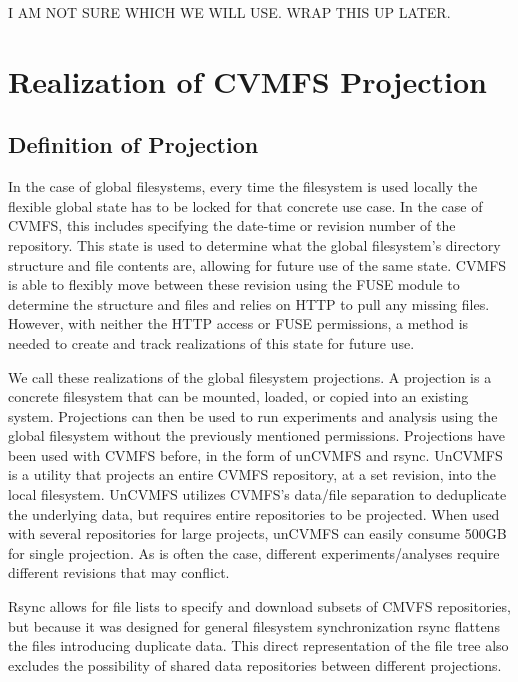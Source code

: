 \documentclass[conference]{IEEEtran}
\begin{document}
I AM NOT SURE WHICH WE WILL USE. WRAP THIS UP LATER.

\section{Realization of CVMFS Projection}



\subsection{Definition of Projection}

In the case of global filesystems,
every time the filesystem is used locally
the flexible global state has to be 
locked for that concrete use case.
In the case of CVMFS,
this includes specifying the date-time
or revision number of the repository.
This state is used to determine 
what the global filesystem's directory
structure and file contents are, 
allowing for future use of the same state.
CVMFS is able to flexibly move
between these revision using the FUSE module
to determine the structure and files and
relies on HTTP to pull any missing files.
However, with neither the HTTP access or
FUSE permissions, a method is needed to 
create and track realizations of this
state for future use.

We call these realizations of the global filesystem
projections.
A projection is a concrete filesystem that can be
mounted, loaded, or copied into an existing system.
Projections can then be used to run experiments
and analysis using the global filesystem without
the previously mentioned permissions.
Projections have been used with CVMFS before,
in the form of unCVMFS and rsync.
UnCVMFS is a utility that projects an entire
CVMFS repository, at a set revision, into the local
filesystem. 
UnCVMFS utilizes CVMFS's data/file separation
to deduplicate the underlying data, but requires
entire repositories to be projected.
When used with several repositories for large projects,
unCVMFS can easily consume 500GB for single projection.
As is often the case, different experiments/analyses 
require different revisions that may conflict.

Rsync allows for file lists to specify and download
subsets of CMVFS repositories, but because it
was designed for general filesystem synchronization
rsync flattens the files introducing duplicate data.
This direct representation of the file tree also
excludes the possibility of shared data repositories
between different projections.
\end{document}

